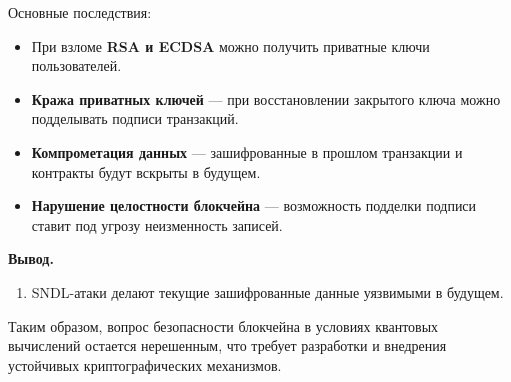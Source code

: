 \documentclass[a4paper]{article}
\begin{document}
Основные последствия:
\begin{itemize}
    \item При взломе \textbf{RSA и ECDSA} можно получить приватные ключи пользователей.
    \item \textbf{Кража приватных ключей} — при восстановлении закрытого ключа можно подделывать подписи транзакций.
    \item \textbf{Компрометация данных} — зашифрованные в прошлом транзакции и контракты будут вскрыты в будущем.
    \item \textbf{Нарушение целостности блокчейна} — возможность подделки подписи ставит под угрозу неизменность записей.
\end{itemize}

\noindent\textbf{Вывод.}  
\begin{enumerate}
    \item SNDL-атаки делают текущие зашифрованные данные уязвимыми в будущем.
\end{enumerate}

Таким образом, вопрос безопасности блокчейна в условиях квантовых вычислений остается нерешенным, что требует разработки и внедрения устойчивых криптографических механизмов.
\end{document}
